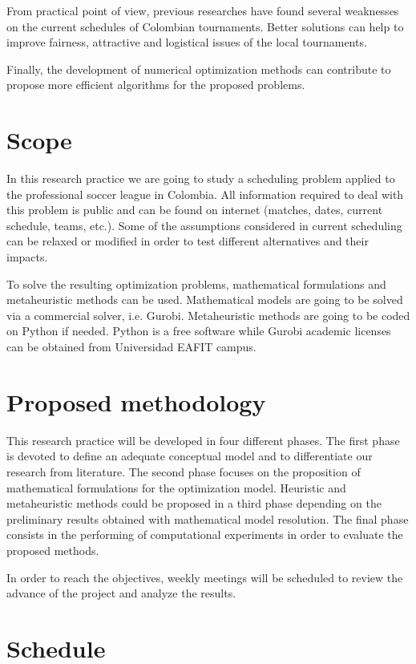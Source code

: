 \documentclass[11pt,letterpaper]{article}
\begin{document}
From practical point of view, previous researches have found several weaknesses on the current schedules of Colombian tournaments. Better solutions can help to improve fairness, attractive and logistical issues of the local tournaments.

Finally, the development of numerical optimization methods can contribute to propose more efficient algorithms for the proposed problems.


\section{Scope}

In this research practice we are going to study a scheduling problem applied to the professional soccer league in Colombia. All information required to deal with this problem is public and can be found on internet (matches, dates, current schedule, teams, etc.). Some of the assumptions considered in current scheduling can be relaxed or modified in order to test different alternatives and their impacts.

To solve the resulting optimization problems, mathematical formulations and metaheuristic methods can be used. Mathematical models are going to be solved via a commercial solver, i.e. Gurobi. Metaheuristic methods are going to be coded on Python if needed. Python is a free software while Gurobi academic licenses can be obtained from Universidad EAFIT campus.

\section{Proposed methodology}

This research practice will be developed in four different phases. The first phase is devoted to define an adequate conceptual model and to differentiate our research from literature. The second phase focuses on the proposition of mathematical formulations for the optimization model. Heuristic and metaheuristic methods could be proposed in a third phase depending on the preliminary results obtained with mathematical model resolution. The final phase consists in the performing of computational experiments in order to  evaluate the proposed methods.

In order to reach the objectives, weekly meetings will be scheduled to review the advance of the project and analyze the results.


\section{Schedule}
\end{document}
